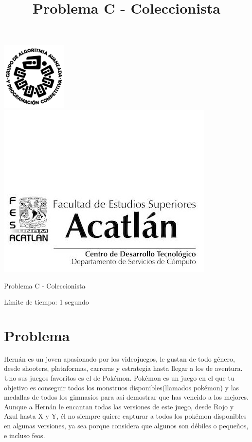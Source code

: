 \documentclass[letter,10pt]{article}
\date{}
\begin{document}
\title{Problema C - Coleccionista}

\includegraphics[scale=0.6]{logo} \hspace*{9.00cm}
\includegraphics[scale=0.5]{dsc} 
\bigskip
\begin{center}
    \Large Problema C - Coleccionista
\end{center}

\begin{flushright}
Límite de tiempo: 1 segundo
\par\end{flushright}
\bigskip

\section*{Problema}

Hernán es un joven apasionado por los videojuegos, le gustan de todo género, desde shooters, plataformas, carreras y estrategia  hasta llegar a los de aventura. Uno sus juegos favoritos es el de Pokémon. Pokémon es un juego en el que tu objetivo es conseguir todos los monstruos disponibles(llamados pokémon) y las medallas de todos los gimnasios para así demostrar que has vencido a los mejores.\\

Aunque a Hernán le encantan todas las versiones de este juego, desde Rojo y Azul hasta X y Y, él no siempre quiere capturar a todos los pokémon disponibles en algunas versiones, ya sea porque considera que algunos son débiles o pequeños, e incluso feos.\\
\end{document}
